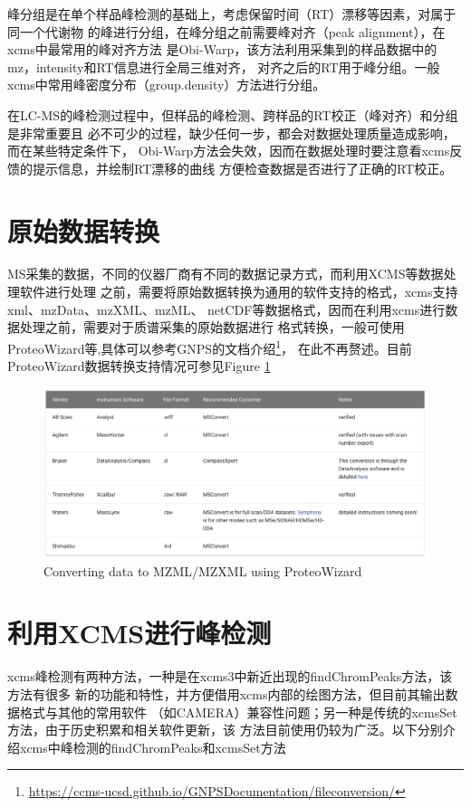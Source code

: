 \documentclass[]{ctexbook}
\renewcommand{\href}[2]{#2\footnote{\url{#1}}}
\begin{document}
峰分组是在单个样品峰检测的基础上，考虑保留时间（RT）漂移等因素，对属于同一个代谢物
的峰进行分组，在峰分组之前需要峰对齐（peak alignment），在xcms中最常用的峰对齐方法
是Obi-Warp，该方法利用采集到的样品数据中的mz，intensity和RT信息进行全局三维对齐，
对齐之后的RT用于峰分组。一般xcms中常用峰密度分布（group.density）方法进行分组。

在LC-MS的峰检测过程中，但样品的峰检测、跨样品的RT校正（峰对齐）和分组是非常重要且
必不可少的过程，缺少任何一步，都会对数据处理质量造成影响，而在某些特定条件下，
Obi-Warp方法会失效，因而在数据处理时要注意看xcms反馈的提示信息，并绘制RT漂移的曲线
方便检查数据是否进行了正确的RT校正。

\section{原始数据转换}

MS采集的数据，不同的仪器厂商有不同的数据记录方式，而利用XCMS等数据处理软件进行处理
之前，需要将原始数据转换为通用的软件支持的格式，xcms支持xml、mzData、mzXML、mzML、
netCDF等数据格式，因而在利用xcms进行数据处理之前，需要对于质谱采集的原始数据进行
格式转换，一般可使用ProteoWizard等,具体可以参考\href{https://ccms-ucsd.github.io/GNPSDocumentation/fileconversion/}{GNPS的文档介绍}，
在此不再赘述。目前ProteoWizard数据转换支持情况可参见Figure \ref{fig:datacovert}\citep{dtcoversion}

\begin{figure}
\centering
\includegraphics{Figures/Fig4.1.png}
\caption{\label{fig:datacovert}Converting data to MZML/MZXML using ProteoWizard\citep{Wang:2019ig}}
\end{figure}

\hypertarget{xcms}{%
\section{利用XCMS进行峰检测}\label{xcms}}

xcms峰检测有两种方法，一种是在xcms3中新近出现的findChromPeaks方法，该方法有很多
新的功能和特性，并方便借用xcms内部的绘图方法，但目前其输出数据格式与其他的常用软件
（如CAMERA）兼容性问题；另一种是传统的xcmsSet方法，由于历史积累和相关软件更新，该
方法目前使用仍较为广泛。以下分别介绍xcms中峰检测的findChromPeaks和xcmsSet方法
\end{document}
